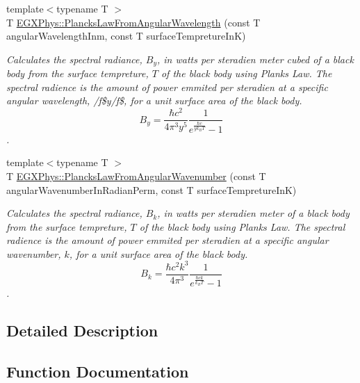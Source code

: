 \begin{DoxyCompactItemize}
{\footnotesize template$<$typename T $>$ }\\T \mbox{\hyperlink{group___e_g_x_phys-_electrodynamics-_black_body-_plancks_law_ga7322124727f968d28807e918c5eeb23f}{E\+G\+X\+Phys\+::\+Plancks\+Law\+From\+Angular\+Wavelength}} (const T angular\+Wavelength\+Inm, const T surface\+Tempreture\+InK)
\begin{DoxyCompactList}\small\item\em Calculates the spectral radiance, $B_{y}$, in watts per steradien meter cubed of a black body from the surface tempreture, $T$ of the black body using Plank\textquotesingle{}s Law. The spectral radience is the amount of power emmited per steradien at a specific angular wavelength, /f\$y/f\$, for a unit surface area of the black body. \[ B_{y} = \dfrac{\hbar c^2}{4\pi^3y^5} \dfrac{1}{e^{\frac{\hbar c}{y k_B T}} - 1} \]. \end{DoxyCompactList}\item 
{\footnotesize template$<$typename T $>$ }\\T \mbox{\hyperlink{group___e_g_x_phys-_electrodynamics-_black_body-_plancks_law_gaa3d3e0fdb77d25bdd40523f9975de902}{E\+G\+X\+Phys\+::\+Plancks\+Law\+From\+Angular\+Wavenumber}} (const T angular\+Wavenumber\+In\+Radian\+Perm, const T surface\+Tempreture\+InK)
\begin{DoxyCompactList}\small\item\em Calculates the spectral radiance, $B_{k}$, in watts per steradien meter of a black body from the surface tempreture, $T$ of the black body using Plank\textquotesingle{}s Law. The spectral radience is the amount of power emmited per steradien at a specific angular wavenumber, $k$, for a unit surface area of the black body. \[ B_{k} = \dfrac{\hbar c^2 k^3}{4\pi^3} \dfrac{1}{e^{\frac{\hbar c k}{k_B T}} - 1} \]. \end{DoxyCompactList}\end{DoxyCompactItemize}


\subsection{Detailed Description}


\subsection{Function Documentation}
\mbox{\label{group___e_g_x_phys-_electrodynamics-_black_body-_plancks_law_ga44d8dc3e072ffc7d860cd8f07463f091}} 
